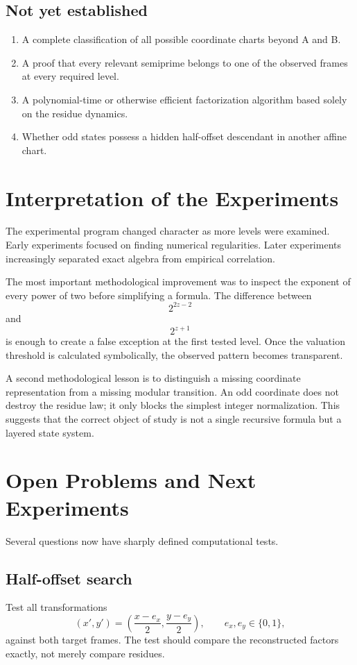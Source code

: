 \documentclass[11pt,a4paper]{article}
\theoremstyle{definition}
\theoremstyle{remark}
\begin{document}
\subsection{Not yet established}
\begin{enumerate}
  \item A complete classification of all possible coordinate charts beyond A and B.
  \item A proof that every relevant semiprime belongs to one of the observed frames at every required level.
  \item A polynomial-time or otherwise efficient factorization algorithm based solely on the residue dynamics.
  \item Whether odd states possess a hidden half-offset descendant in another affine chart.
\end{enumerate}

\section{Interpretation of the Experiments}

The experimental program changed character as more levels were examined. Early experiments focused on finding numerical regularities. Later experiments increasingly separated exact algebra from empirical correlation.

The most important methodological improvement was to inspect the exponent of every power of two before simplifying a formula. The difference between
\[
2^{2z-2}
\]
and
\[
2^{z+1}
\]
is enough to create a false exception at the first tested level. Once the valuation threshold is calculated symbolically, the observed pattern becomes transparent.

A second methodological lesson is to distinguish a missing coordinate representation from a missing modular transition. An odd coordinate does not destroy the residue law; it only blocks the simplest integer normalization. This suggests that the correct object of study is not a single recursive formula but a layered state system.

\section{Open Problems and Next Experiments}

Several questions now have sharply defined computational tests.

\subsection{Half-offset search}
Test all transformations
\[
(x',y')=\left(\frac{x-e_x}{2},\frac{y-e_y}{2}\right),
\qquad e_x,e_y\in\{0,1\},
\]
against both target frames. The test should compare the reconstructed factors exactly, not merely compare residues.
\end{document}

